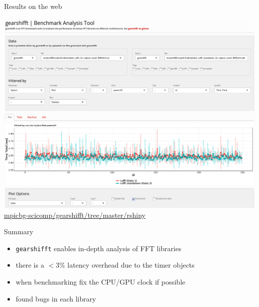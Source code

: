 \documentclass[t,11pt,hyperref={
  pdftitle = {gearshifft},
  pdfsubject = {gearshifft},
  pdfborder={0 0 0},
  colorlinks=true,
  urlcolor=red,
  citecolor=red,
  linkcolor=red,
  pdfauthor={Peter Steinbach, Matthias Werner}
  }
]{beamer}
\def\resetbeamertemplate{\setbeamertemplate{background canvas}{ }}
\newcommand{\gearshifft}{\texttt{gearshifft}}
\begin{document}
\begin{frame}{Results on the web}
  \begin{center}
    \includegraphics[width=.8\textwidth]{rshiny.png}\\[20pt]
    \href{https://github.com/mpicbg-scicomp/gearshifft/tree/master/rshiny}{mpicbg-scicomp/gearshifft/tree/master/rshiny}
  \end{center}

\end{frame}


\begin{frame}{Summary}{}
  
  \begin{itemize}
  \item \gearshifft{} enables in-depth analysis of FFT libraries
  \item there is a $<3\%$ latency overhead due to the timer objects
  \item when benchmarking fix the CPU/GPU clock if possible
  \item found bugs in each library
  \end{itemize}
\end{frame}
\end{document}
